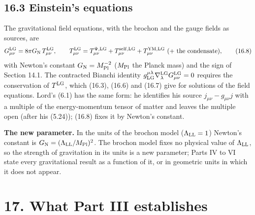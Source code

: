 \documentclass[
  10pt,
]{article}
\begin{document}
\hypertarget{einsteins-equations}{%
\subsection{16.3 Einstein's equations}\label{einsteins-equations}}

The gravitational field equations, with the brochon and the gauge fields
as sources, are
\[G^{\rm LG}_{\mu\nu}=8\pi G_{\rm N}\,T^{\rm LG}_{\mu\nu},\qquad T^{\rm LG}_{\mu\nu}=T^{\Psi,{\rm LG}}_{\mu\nu}+T^{\rm self,LG}_{\mu\nu}+T^{\rm YM,LG}_{\mu\nu}\ (+\ \text{the condensate}),\tag{16.8}\]
with Newton's constant \(G_{\rm N}=M_{\rm Pl}^{-2}\) (\(M_{\rm Pl}\) the
Planck mass) and the sign of Section 14.1. The contracted Bianchi
identity
\(g_{\rm LG}^{\mu\lambda}\nabla^{\rm LG}_\lambda G^{\rm LG}_{\mu\nu}=0\)
requires the conservation of \(T^{\rm LG}\), which (16.3), (16.6) and
(16.7) give for solutions of the field equations. Lord's (6.1) has the
same form: he identifies his source \(j_{\mu\nu}-g_{\mu\nu}j\) with a
multiple of the energy-momentum tensor of matter and leaves the multiple
open (after his (5.24)); (16.8) fixes it by Newton's constant.

\textbf{The new parameter.} In the units of the brochon model
(\(\Lambda_{\rm LL}=1\)) Newton's constant is
\(G_{\rm N}=(\Lambda_{\rm LL}/M_{\rm Pl})^2\). The brochon model fixes
no physical value of \(\Lambda_{\rm LL}\), so the strength of
gravitation in its units is a new parameter; Parts IV to VI state every
gravitational result as a function of it, or in geometric units in which
it does not appear.

\hypertarget{what-part-iii-establishes}{%
\section{17. What Part III
establishes}\label{what-part-iii-establishes}}
\end{document}
